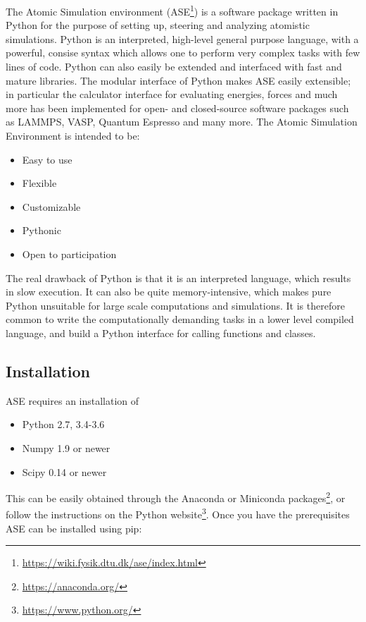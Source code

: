 The Atomic Simulation environment (ASE\footnote{
\url{https://wiki.fysik.dtu.dk/ase/index.html}})
\parencite[Larsen et al.]{larsen2017atomic}
is a software package written in Python for the purpose
of setting up, steering and analyzing atomistic simulations.
Python is an interpreted, high-level general purpose language,
with a powerful, consise syntax which allows one to perform
very complex tasks with few lines of code. Python can also
easily be extended and interfaced with fast and mature
libraries. The modular interface of Python makes ASE
easily extensible; in particular the calculator interface
for evaluating energies, forces and much more has been
implemented for open- and closed-source software packages 
such as LAMMPS, VASP, Quantum Espresso and many more.
The Atomic Simulation Environment is intended to be:

\begin{itemize}
    \item Easy to use
    \item Flexible
    \item Customizable
    \item Pythonic
    \item Open to participation
\end{itemize}

The real drawback of Python is that it is an interpreted language,
which results in slow execution. It can also be quite memory-intensive,
which makes pure Python unsuitable for large scale computations
and simulations. It is therefore common to write the
computationally demanding tasks in a lower level compiled language,
and build a Python interface for calling functions and classes.

\subsection{Installation}
ASE requires an installation of

\begin{itemize}
    \item Python 2.7, 3.4-3.6
    \item Numpy 1.9 or newer
    \item Scipy 0.14 or newer
\end{itemize}

This can be easily obtained through the Anaconda 
or Miniconda packages\footnote{\url{https://anaconda.org/}},
or follow the instructions on the Python website\footnote{
\url{https://www.python.org/}}.
Once you have the prerequisites ASE can be installed using pip:

